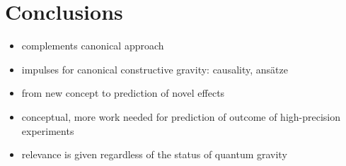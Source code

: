 \chapter{Conclusions}
\begin{itemize}
\item complements canonical approach
\item impulses for canonical constructive gravity: causality, ansätze
\item from new concept to prediction of novel effects
\item conceptual, more work needed for prediction of outcome of high-precision experiments
\item relevance is given regardless of the status of quantum gravity
\end{itemize}
